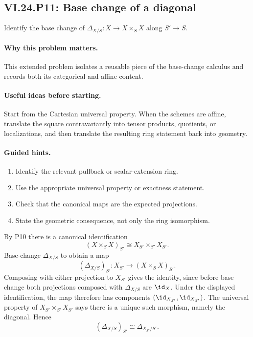 \subsection*{VI.24.P11: Base change of a diagonal}
\begin{problem}\label{prob:vi24-p11}
Identify the base change of $\Delta_{X/S}:X\to X\times_SX$ along $S'\to S$.
\end{problem}

\ifdefined\FullProblemDossiers
\paragraph{Why this problem matters.}
This extended problem isolates a reusable piece of the base-change calculus and records both its categorical and affine content.

\paragraph{Useful ideas before starting.}
Start from the Cartesian universal property.  When the schemes are affine, translate the square contravariantly into tensor products, quotients, or localizations, and then translate the resulting ring statement back into geometry.

\paragraph{Guided hints.}
\begin{enumerate}
\item Identify the relevant pullback or scalar-extension ring.
\item Use the appropriate universal property or exactness statement.
\item Check that the canonical maps are the expected projections.
\item State the geometric consequence, not only the ring isomorphism.
\end{enumerate}

\begin{solution}
By P10 there is a canonical identification
\[
(X\times_SX)_{S'}\cong X_{S'}\times_{S'}X_{S'}.
\]
Base-change $\Delta_{X/S}$ to obtain a map
\[
(\Delta_{X/S})_{S'}:X_{S'}\to(X\times_SX)_{S'}.
\]
Composing with either projection to $X_{S'}$ gives the identity, since before base change both projections composed with $\Delta_{X/S}$ are $\id_X$.  Under the displayed identification, the map therefore has components $(\id_{X_{S'}},\id_{X_{S'}})$.  The universal property of $X_{S'}\times_{S'}X_{S'}$ says there is a unique such morphism, namely the diagonal.  Hence
\[
(\Delta_{X/S})_{S'}\cong\Delta_{X_{S'}/S'}.
\]
\end{solution}

